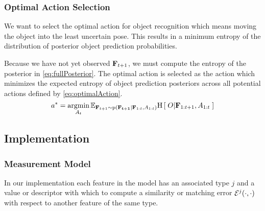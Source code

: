 \subsubsection{Optimal Action Selection}            
            
            We want to select the optimal action for object recognition which means moving the object into the least uncertain pose. This results in a minimum entropy of the distribution of posterior object prediction probabilities. 

            Because we have not yet observed $\mathbf{F}_{t+1}$, we must compute the  entropy of the posterior in \eqref{eq:fullPosterior}. The optimal action is selected as the action which minimizes the expected entropy of object prediction posteriors across all potential actions defined by \eqref{eq:optimalAction}.
            {\small
            \begin{equation}
                \label{eq:optimalAction}
                a^* = \argmin_{A_t} \expectedValue{ \entropy{O|\set{F}_{1:t+1},A_{1:t}} }{\set{F}_{t+1} \sim \prob{\set{F_{t+1}}|\set{F}_{1:t},A_{1:t}}}
            \end{equation}
            }
            
    \subsection{Implementation}
        \subsubsection{Measurement Model}

 
            In our implementation each feature in the model has an associated type $j$ and a value or descriptor with which to compute a similarity or matching error $\mathcal{E}^j(\cdot,\cdot)$ with respect to another feature of the same type.

